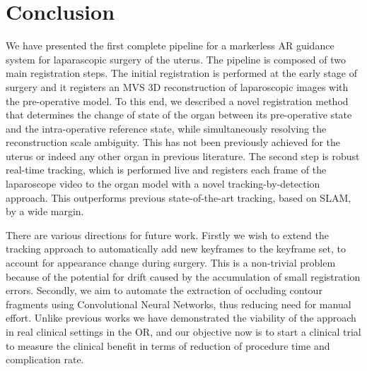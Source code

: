 \documentclass[journal]{IEEEtran}
\begin{document}











  
\section{Conclusion}
\label{sec:conclusion}
We have presented the first complete pipeline for a markerless AR guidance system for laparascopic surgery of the uterus. The pipeline is composed of two main registration steps. The initial registration is performed at the early stage of surgery and it registers an MVS 3D reconstruction of laparoscopic images with the pre-operative model. To this end, we described a novel registration method that determines the change of state of the organ between its pre-operative state and the intra-operative reference state, while simultaneously resolving the reconstruction scale ambiguity. This has not been previously achieved for the uterus or indeed any other organ in previous literature. The second step is robust real-time tracking, which is performed live and registers each frame of the laparoscope video to the organ model with a
novel tracking-by-detection approach. This outperforms previous state-of-the-art tracking, based on SLAM, by a wide margin. %

There are various directions for future work. Firstly we wish to extend the tracking approach to automatically add new keyframes to the keyframe set, to account for appearance change during surgery. This is a non-trivial problem because of the potential for drift caused by the accumulation of small registration errors. Secondly, we aim to automate the extraction of occluding contour fragments using Convolutional Neural Networks, thus reducing need for manual effort. Unlike previous works we have demonstrated the viability of the approach in real clinical settings in the OR, and our objective now is to start a clinical trial to measure the clinical benefit in terms of reduction of procedure time and complication rate.
\end{document}
